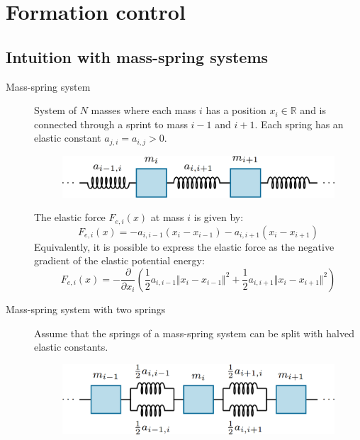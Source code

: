 \chapter{Formation control}


\section{Intuition with mass-spring systems}

\begin{description}
    \item[Mass-spring system] 
        System of $N$ masses where each mass $i$ has a position $x_i \in \mathbb{R}$ and is connected through a sprint to mass $i-1$ and $i+1$. Each spring has an elastic constant $a_{j, i} = a_{i, j} > 0$.

        \begin{figure}[H]
            \centering
            \includegraphics[width=0.5\linewidth]{./img/mass_spring_system.png}
        \end{figure}

        The elastic force $F_{e,i}(x)$ at mass $i$ is given by:
        \[
            F_{e,i}(x) = -a_{i,i-1}(x_i-x_{i-1}) - a_{i,i+1}(x_i - x_{i+1})
        \]
        Equivalently, it is possible to express the elastic force as the negative gradient of the elastic potential energy:
        \[
            F_{e,i}(x) = -\frac{\partial}{\partial x_i}\left( \frac{1}{2} a_{i,i-1} \Vert x_i - x_{i-1} \Vert^2 + \frac{1}{2} a_{i,i+1} \Vert x_i - x_{i+1} \Vert^2 \right)
        \]

    \item[Mass-spring system with two springs] 
        Assume that the springs of a mass-spring system can be split with halved elastic constants.
        \begin{figure}[H]
            \centering
            \includegraphics[width=0.5\linewidth]{./img/mass_spring_system2.png}
        \end{figure}


\end{description}
